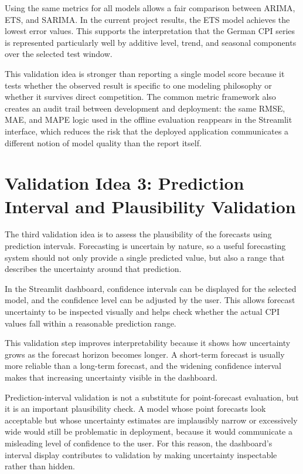Using the same metrics for all models allows a fair comparison between ARIMA, ETS, and SARIMA. In the current project results, the ETS model achieves the lowest error values. This supports the interpretation that the German CPI series is represented particularly well by additive level, trend, and seasonal components over the selected test window.

This validation idea is stronger than reporting a single model score because it tests whether the observed result is specific to one modeling philosophy or whether it survives direct competition. The common metric framework also creates an audit trail between development and deployment: the same RMSE, MAE, and MAPE logic used in the offline evaluation reappears in the Streamlit interface, which reduces the risk that the deployed application communicates a different notion of model quality than the report itself.

\section{Validation Idea 3: Prediction Interval and Plausibility Validation}

The third validation idea is to assess the plausibility of the forecasts using prediction intervals. Forecasting is uncertain by nature, so a useful forecasting system should not only provide a single predicted value, but also a range that describes the uncertainty around that prediction.

In the Streamlit dashboard, confidence intervals can be displayed for the selected model, and the confidence level can be adjusted by the user. This allows forecast uncertainty to be inspected visually and helps check whether the actual CPI values fall within a reasonable prediction range.

This validation step improves interpretability because it shows how uncertainty grows as the forecast horizon becomes longer. A short-term forecast is usually more reliable than a long-term forecast, and the widening confidence interval makes that increasing uncertainty visible in the dashboard.

Prediction-interval validation is not a substitute for point-forecast evaluation, but it is an important plausibility check. A model whose point forecasts look acceptable but whose uncertainty estimates are implausibly narrow or excessively wide would still be problematic in deployment, because it would communicate a misleading level of confidence to the user. For this reason, the dashboard's interval display contributes to validation by making uncertainty inspectable rather than hidden.

